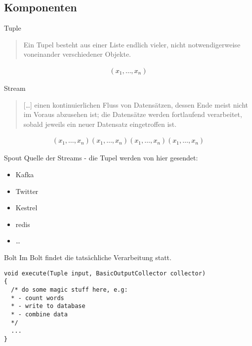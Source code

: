 \documentclass{beamer}
\begin{document}
\subsection{Komponenten}
\begin{frame}[t]{Tuple}
  \begin{quote}
    Ein Tupel besteht aus einer Liste endlich vieler, nicht notwendigerweise voneinander verschiedener Objekte.
  \end{quote}

  \begin{align*}
    (x_1, \ldots , x_n)
  \end{align*}
\end{frame}

\begin{frame}[t]{Stream}
  \begin{quote}
    [\ldots] einen kontinuierlichen Fluss von Datensätzen, dessen Ende meist nicht im Voraus abzusehen ist; die Datensätze werden fortlaufend verarbeitet, sobald jeweils ein neuer Datensatz eingetroffen ist.
  \end{quote}

  \begin{align*}
    (x_1, \ldots , x_n)
    (x_1, \ldots , x_n)
    (x_1, \ldots , x_n)
    (x_1, \ldots , x_n)
  \end{align*}
\end{frame}

\begin{frame}[t]{Spout}
  Quelle der Streams - die Tupel werden von hier gesendet: 
  \begin{itemize}
    \item Kafka 
    \item Twitter 
    \item Kestrel 
    \item redis
    \item \ldots
  \end{itemize}
\end{frame}

\begin{frame}[fragile]{Bolt}
  Im Bolt findet die tatsächliche Verarbeitung statt.
  \begin{lstlisting}
void execute(Tuple input, BasicOutputCollector collector)
{
  /* do some magic stuff here, e.g:
  * - count words
  * - write to database
  * - combine data
  */
  ...
}

  \end{lstlisting}
\end{frame}
\end{document}
